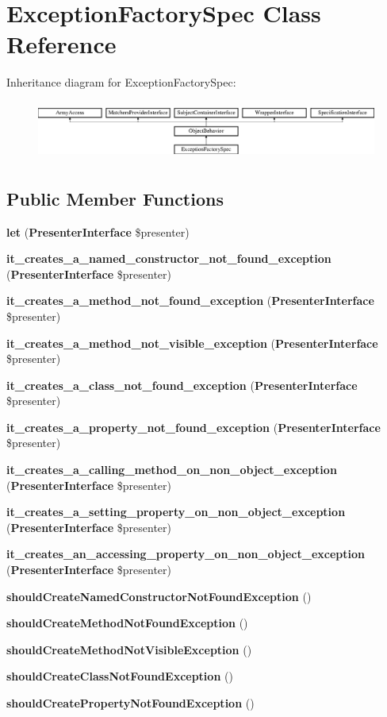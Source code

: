 \section{Exception\+Factory\+Spec Class Reference}
\label{classspec_1_1_php_spec_1_1_exception_1_1_exception_factory_spec}
Inheritance diagram for Exception\+Factory\+Spec\+:\begin{figure}[H]
\begin{center}
\leavevmode
\includegraphics[height=1.953488cm]{classspec_1_1_php_spec_1_1_exception_1_1_exception_factory_spec}
\end{center}
\end{figure}
\subsection*{Public Member Functions}
\begin{DoxyCompactItemize}
\item 
{\bf let} ({\bf Presenter\+Interface} \$presenter)
\item 
{\bf it\+\_\+creates\+\_\+a\+\_\+named\+\_\+constructor\+\_\+not\+\_\+found\+\_\+exception} ({\bf Presenter\+Interface} \$presenter)
\item 
{\bf it\+\_\+creates\+\_\+a\+\_\+method\+\_\+not\+\_\+found\+\_\+exception} ({\bf Presenter\+Interface} \$presenter)
\item 
{\bf it\+\_\+creates\+\_\+a\+\_\+method\+\_\+not\+\_\+visible\+\_\+exception} ({\bf Presenter\+Interface} \$presenter)
\item 
{\bf it\+\_\+creates\+\_\+a\+\_\+class\+\_\+not\+\_\+found\+\_\+exception} ({\bf Presenter\+Interface} \$presenter)
\item 
{\bf it\+\_\+creates\+\_\+a\+\_\+property\+\_\+not\+\_\+found\+\_\+exception} ({\bf Presenter\+Interface} \$presenter)
\item 
{\bf it\+\_\+creates\+\_\+a\+\_\+calling\+\_\+method\+\_\+on\+\_\+non\+\_\+object\+\_\+exception} ({\bf Presenter\+Interface} \$presenter)
\item 
{\bf it\+\_\+creates\+\_\+a\+\_\+setting\+\_\+property\+\_\+on\+\_\+non\+\_\+object\+\_\+exception} ({\bf Presenter\+Interface} \$presenter)
\item 
{\bf it\+\_\+creates\+\_\+an\+\_\+accessing\+\_\+property\+\_\+on\+\_\+non\+\_\+object\+\_\+exception} ({\bf Presenter\+Interface} \$presenter)
\item 
{\bf should\+Create\+Named\+Constructor\+Not\+Found\+Exception} ()
\item 
{\bf should\+Create\+Method\+Not\+Found\+Exception} ()
\item 
{\bf should\+Create\+Method\+Not\+Visible\+Exception} ()
\item 
{\bf should\+Create\+Class\+Not\+Found\+Exception} ()
\item 
{\bf should\+Create\+Property\+Not\+Found\+Exception} ()
\end{DoxyCompactItemize}
